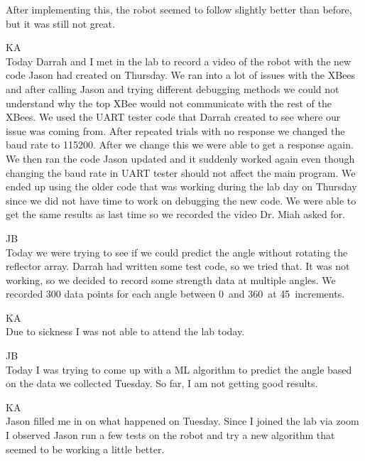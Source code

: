 \documentclass[fontsize=11pt, %
                             paper=letter, %
                             openany, %
                             captions=tableheading,
                             index=totoc,
                             hyperref]{labbook}
\begin{document}
\begin{addmargin}[0cm]{0cm}
\vspace{12pt}
After implementing this, the robot seemed to follow slightly better than before, but it was still not great.

KA\\
Today Darrah and I met in the lab to record a video of the robot with the new code Jason had created on Thursday. We ran into a lot of issues with the XBees and after calling Jason and trying different debugging methods we could not understand why the top XBee would not communicate with the rest of the XBees. We used the UART tester code that Darrah created to see where our issue was coming from. After repeated trials with no response we changed the baud rate to 115200. After we change this we were able to get a response again. We then ran the code Jason updated and it suddenly worked again even though changing the baud rate in UART tester should not affect the main program. We ended up using the older code that was working during the lab day on Thursday since we did not have time to work on debugging the new code. We were able to get the same results as last time so we recorded the video Dr. Miah asked for.

JB\\
Today we were trying to see if we could predict the angle without rotating the reflector array. Darrah had written some test code, so we tried that. It was not working, so we decided to record some strength data at multiple angles. We recorded 300 data points for each angle between 0\textdegree~and 360\textdegree~at 45\textdegree~increments.

\vspace*{12pt}
KA\\
Due to sickness I was not able to attend the lab today.

JB\\
Today I was trying to come up with a ML algorithm to predict the angle based on the data we collected Tuesday. So far, I am not getting good results.

\vspace*{12pt}
KA\\
Jason filled me in on what happened on Tuesday. Since I joined the lab via zoom I observed Jason run a few tests on the robot and try a new algorithm that seemed to be working a little better. 


\end{addmargin}
\end{document}
